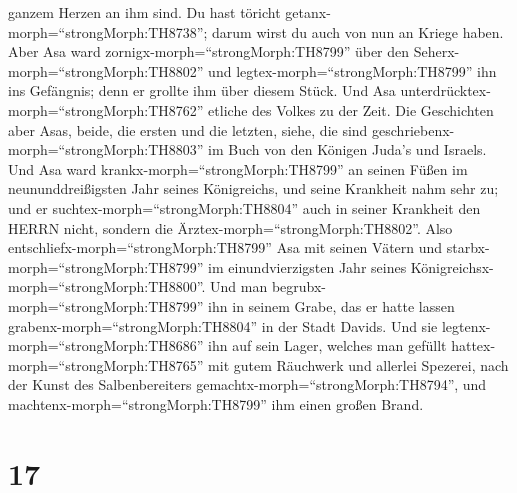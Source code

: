 ganzem Herzen an ihm sind. Du hast töricht
getanx-morph=``strongMorph:TH8738''; darum wirst du auch von nun an
Kriege haben.  Aber Asa ward
zornigx-morph=``strongMorph:TH8799'' über den
Seherx-morph=``strongMorph:TH8802'' und
legtex-morph=``strongMorph:TH8799'' ihn ins Gefängnis; denn er grollte
ihm über diesem Stück. Und Asa
unterdrücktex-morph=``strongMorph:TH8762'' etliche des Volkes zu der
Zeit.  Die Geschichten aber Asas, beide, die ersten und die
letzten, siehe, die sind geschriebenx-morph=``strongMorph:TH8803'' im
Buch von den Königen Juda's und Israels.  Und Asa ward
krankx-morph=``strongMorph:TH8799'' an seinen Füßen im
neununddreißigsten Jahr seines Königreichs, und seine Krankheit nahm
sehr zu; und er suchtex-morph=``strongMorph:TH8804'' auch in seiner
Krankheit den HERRN nicht, sondern die
Ärztex-morph=``strongMorph:TH8802''.  Also
entschliefx-morph=``strongMorph:TH8799'' Asa mit seinen Vätern und
starbx-morph=``strongMorph:TH8799'' im einundvierzigsten Jahr seines
Königreichsx-morph=``strongMorph:TH8800''.  Und man
begrubx-morph=``strongMorph:TH8799'' ihn in seinem Grabe, das er hatte
lassen grabenx-morph=``strongMorph:TH8804'' in der Stadt Davids. Und sie
legtenx-morph=``strongMorph:TH8686'' ihn auf sein Lager, welches man
gefüllt hattex-morph=``strongMorph:TH8765'' mit gutem Räuchwerk und
allerlei Spezerei, nach der Kunst des Salbenbereiters
gemachtx-morph=``strongMorph:TH8794'', und
machtenx-morph=``strongMorph:TH8799'' ihm einen großen Brand.

\hypertarget{section-16}{%
\section{17}\label{section-16}}

